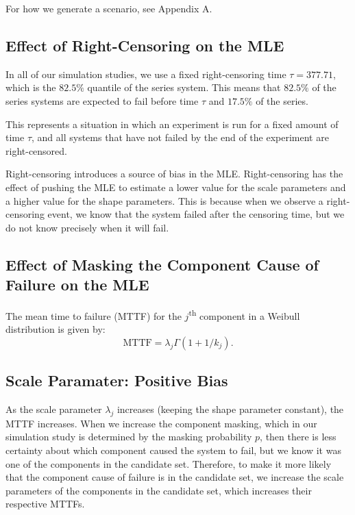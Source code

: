 \documentclass[
]{article}
\begin{document}
For how we generate a scenario, see Appendix A.

\hypertarget{effect-of-right-censoring-on-the-mle}{%
\subsection{Effect of Right-Censoring on the
MLE}\label{effect-of-right-censoring-on-the-mle}}

In all of our simulation studies, we use a fixed right-censoring time
\(\tau = 377.71\), which is the \(82.5\%\) quantile of the series
system. This means that \(82.5\%\) of the series systems are expected to
fail before time \(\tau\) and \(17.5\%\) of the series.

This represents a situation in which an experiment is run for a fixed
amount of time \(\tau\), and all systems that have not failed by the end
of the experiment are right-censored.

Right-censoring introduces a source of bias in the MLE. Right-censoring
has the effect of pushing the MLE to estimate a lower value for the
scale parameters and a higher value for the shape parameters. This is
because when we observe a right-censoring event, we know that the system
failed after the censoring time, but we do not know precisely when it
will fail.

\hypertarget{effect-of-masking-the-component-cause-of-failure-on-the-mle}{%
\subsection{Effect of Masking the Component Cause of Failure on the
MLE}\label{effect-of-masking-the-component-cause-of-failure-on-the-mle}}

The mean time to failure (MTTF) for the \(j\)\textsuperscript{th}
component in a Weibull distribution is given by: \[
\text{MTTF} = \lambda_j \Gamma(1 + 1/k_j).
\]

\hypertarget{scale-paramater-positive-bias}{%
\subsection{Scale Paramater: Positive
Bias}\label{scale-paramater-positive-bias}}

As the scale parameter \(\lambda_j\) increases (keeping the shape
parameter constant), the MTTF increases. When we increase the component
masking, which in our simulation study is determined by the masking
probability \(p\), then there is less certainty about which component
caused the system to fail, but we know it was one of the components in
the candidate set. Therefore, to make it more likely that the component
cause of failure is in the candidate set, we increase the scale
parameters of the components in the candidate set, which increases their
respective MTTFs.
\end{document}
